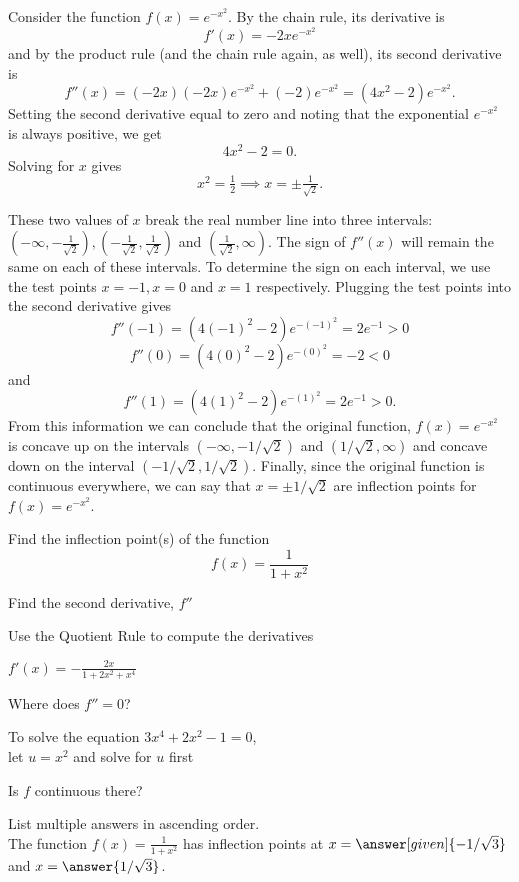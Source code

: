 \documentclass{ximera}
\begin{document}
\begin{example} %
Consider the function $f(x) = e^{-x^2}.$ By the chain rule, its derivative is 
\[
f'(x) = -2xe^{-x^2}
\]
and by the product rule (and the chain rule again, as well), its second derivative is
\[
f''(x) = (-2x)(-2x)e^{-x^2} + (-2)e^{-x^2} = (4x^2 - 2)e^{-x^2}.
\]
Setting the second derivative equal to zero and noting that the exponential $e^{-x^2}$ is
always positive, we get
\[
4x^2 - 2 = 0.
\]
Solving for $x$ gives
\[
x^2 = \tfrac 12 \implies  x = \pm \tfrac{1}{\sqrt{2}}.
\]

These two values of $x$ break the real number line into three intervals: $(-\infty, -\tfrac{1}{\sqrt 2}),
(-\tfrac{1}{\sqrt 2}, \tfrac{1}{\sqrt 2})$ and $(\tfrac{1}{\sqrt 2}, \infty)$. 
The sign of $f''(x)$ will remain the same on each of these intervals. 
To determine the sign on each interval, we use the test points
$x = -1, x = 0$ and $x = 1$ respectively.
Plugging the test points into the second derivative gives
\[
f''(-1) = (4(-1)^2 - 2) e^{-(-1)^2} = 2e^{-1} > 0
\]
\[
f''(0) = (4(0)^2 - 2) e^{-(0)^2} = -2 < 0
\]
and
\[
f''(1) = (4(1)^2 - 2) e^{-(1)^2} = 2e^{-1} > 0.
\]
From this information we can conclude that the original function, $f(x) = e^{-x^2}$
is concave up on the intervals $(-\infty, -1/\sqrt 2)$ and $(1/\sqrt 2, \infty)$ and 
concave down on the interval $(-1/\sqrt 2, 1/\sqrt 2)$. 
Finally, since the original function is continuous everywhere, we can
say that $x = \pm 1/\sqrt 2$ are inflection points for $f(x) = e^{-x^2}$.
\end{example}

\begin{problem} %
  Find the inflection point(s) of the function
  \[
     f(x) = \frac{1}{1+x^2}
  \]
 
    \begin{hint}
      Find the second derivative, $f''$
    \end{hint}
    \begin{hint}
      Use the Quotient Rule to compute the derivatives
    \end{hint}
		\begin{hint}
      $f'(x) = -\frac{2x}{1+2x^2+x^4}$
    \end{hint}
		\begin{hint}
      Where does $f'' = 0$?
    \end{hint}
		\begin{hint}
		 To solve the equation $3x^4 + 2x^2 - 1 = 0$, \\
		 let $u = x^2$ and solve for $u$ first
    \end{hint}
		\begin{hint}
      Is $f$ continuous there?
    \end{hint}  
		List multiple answers in ascending order.\\
		The function $f(x) = \frac{1}{1+x^2}$ has inflection 
		points at $x =\answer[given]{-1/\sqrt 3}$ and $x=\answer{1/\sqrt 3}$.
		
		
\end{problem}
\end{document}
